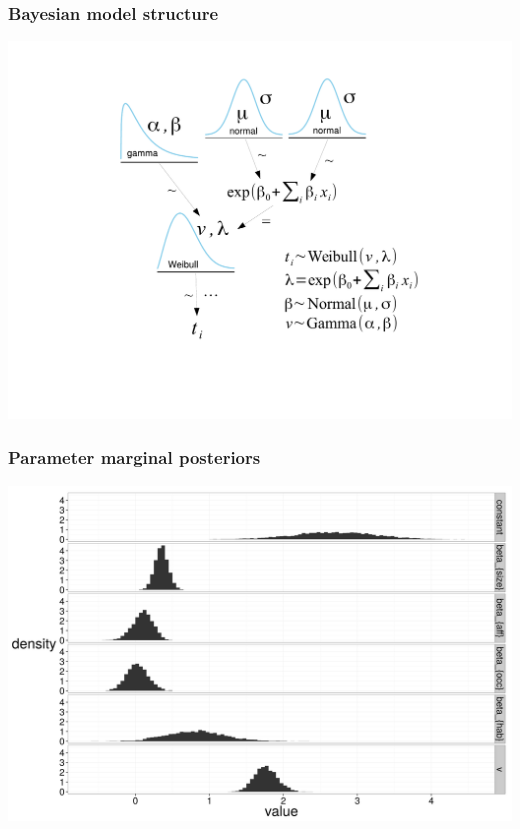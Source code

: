 \documentclass{beamer}
\begin{document}
\begin{frame}
  \frametitle{Bayesian model structure}
  \begin{center}
    \includegraphics[height = 0.8\textheight, width = \textwidth, keepaspectratio = true]{figure/surv_mod}
  \end{center}
\end{frame}


\begin{frame}  %
  \frametitle{Parameter marginal posteriors}
  \begin{center}
    \includegraphics[height = 0.8\textheight, width = \textwidth, keepaspectratio = true]{figure/post}
  \end{center}
\end{frame}
\end{document}
